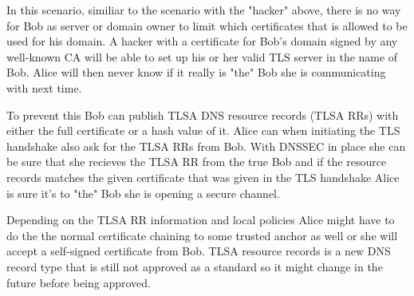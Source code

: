 In this scenario, similiar to the scenario with the "hacker" above, there is no way for Bob as server or domain owner to limit which certificates that is allowed to be used for his domain.
A hacker with a certificate for Bob's domain signed by any well-known CA will be able to set up his or her valid TLS server in the name of Bob.
Alice will then never know if it really is "the" Bob she is communicating with next time.

To prevent this Bob can publish TLSA DNS resource records (TLSA RRs)\cite[ch. 2]{rfc:draft-dane} with either the full certificate or a hash value of it.
Alice can when initiating the TLS handshake also ask for the TLSA RRs from Bob.
With DNSSEC in place she can be sure that she recieves the TLSA RR from the true Bob and if the resource records matches the given certificate that was given in the TLS handshake Alice is sure it's to "the" Bob she is opening a secure channel.

Depending on the TLSA RR information and local policies Alice might have to do the the normal certificate chaining to some trusted anchor as well or she will accept a self-signed certificate from Bob.
TLSA resource records is a new DNS record type that is still not approved as a standard so it might change in the future before being approved.




